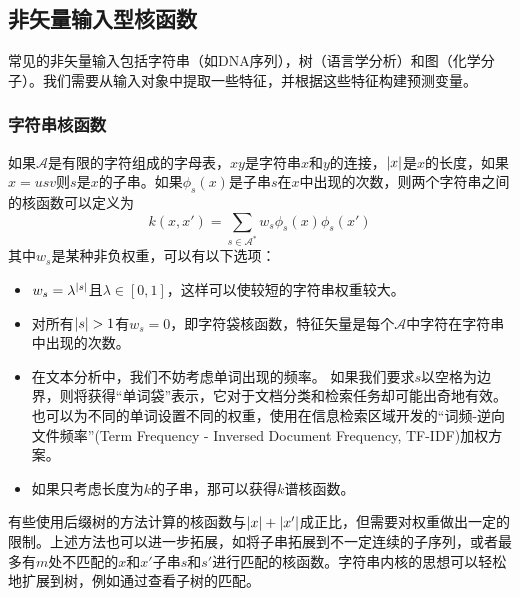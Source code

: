 \documentclass[12pt,UTF8]{article}
\begin{document}
        \subsection{非矢量输入型核函数}
            常见的非矢量输入包括字符串（如DNA序列），树（语言学分析）和图（化学分子）。我们需要从输入对象中提取一些特征，并根据这些特征构建预测变量。
            \subsubsection{字符串核函数}
                如果$\mathcal{A}$是有限的字符组成的字母表，$xy$是字符串$x$和$y$的连接，$\abs{x}$是$x$的长度，如果$x=usv$则$s$是$x$的子串。如果$\phi_s(x)$是子串$s$在$x$中出现的次数，则两个字符串之间的核函数可以定义为
                \begin{equation}
                    k(x,x')=\sum_{s\in\mathcal{A}^*}{w_s\phi_s(x)\phi_s(x')}
                \end{equation}
                其中$w_s$是某种非负权重，可以有以下选项：
                \begin{itemize}
                    \item $w_s=\lambda^{\abs{s}}$且$\lambda\in[0,1]$，这样可以使较短的字符串权重较大。
                    \item 对所有$\abs{s}>1$有$w_s=0$，即字符袋核函数，特征矢量是每个$\mathcal{A}$中字符在字符串中出现的次数。
                    \item 在文本分析中，我们不妨考虑单词出现的频率。 如果我们要求$s$以空格为边界，则将获得“单词袋”表示，它对于文档分类和检索任务却可能出奇地有效。也可以为不同的单词设置不同的权重，使用在信息检索区域开发的“词频-逆向文件频率”(Term Frequency - Inversed Document Frequency, TF-IDF)加权方案。
                    \item 如果只考虑长度为$k$的子串，那可以获得$k$谱核函数。
                \end{itemize}\par
                有些使用后缀树的方法计算的核函数与$\abs{x}+\abs{x'}$成正比，但需要对权重做出一定的限制。上述方法也可以进一步拓展，如将子串拓展到不一定连续的子序列，或者最多有$m$处不匹配的$x$和$x'$子串$s$和$s'$进行匹配的核函数。字符串内核的思想可以轻松地扩展到树，例如通过查看子树的匹配。
\end{document}

